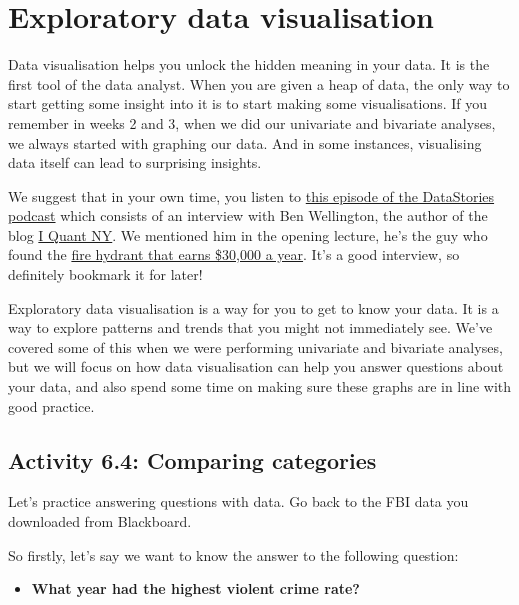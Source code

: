 \documentclass[
]{book}
\providecommand{\tightlist}{%
  \setlength{\itemsep}{0pt}\setlength{\parskip}{0pt}}
\begin{document}
\hypertarget{exploratory-data-visualisation}{%
\section{Exploratory data visualisation}\label{exploratory-data-visualisation}}

Data visualisation helps you unlock the hidden meaning in your data. It is the first tool of the data analyst. When you are given a heap of data, the only way to start getting some insight into it is to start making some visualisations. If you remember in weeks 2 and 3, when we did our univariate and bivariate analyses, we always started with graphing our data. And in some instances, visualising data itself can lead to surprising insights.

We suggest that in your own time, you listen to \href{http://datastori.es/66-iquantnyc/}{this episode of the DataStories podcast} which consists of an interview with Ben Wellington, the author of the blog \href{http://iquantny.tumblr.com/}{I Quant NY}. We mentioned him in the opening lecture, he's the guy who found the \href{https://www.dailymail.co.uk/news/article-2618927/Blurred-lines-How-New-York-fire-hydrant-sees-33-000-flow-city-coffers-parking-fines.html}{fire hydrant that earns \$30,000 a year}. It's a good interview, so definitely bookmark it for later!

Exploratory data visualisation is a way for you to get to know your data. It is a way to explore patterns and trends that you might not immediately see. We've covered some of this when we were performing univariate and bivariate analyses, but we will focus on how data visualisation can help you answer questions about your data, and also spend some time on making sure these graphs are in line with good practice.

\hypertarget{activity-6.4-comparing-categories}{%
\subsection{Activity 6.4: Comparing categories}\label{activity-6.4-comparing-categories}}

Let's practice answering questions with data. Go back to the FBI data you downloaded from Blackboard.

So firstly, let's say we want to know the answer to the following question:

\begin{itemize}
\tightlist
\item
  \textbf{What year had the highest violent crime rate?}
\end{itemize}
\end{document}
